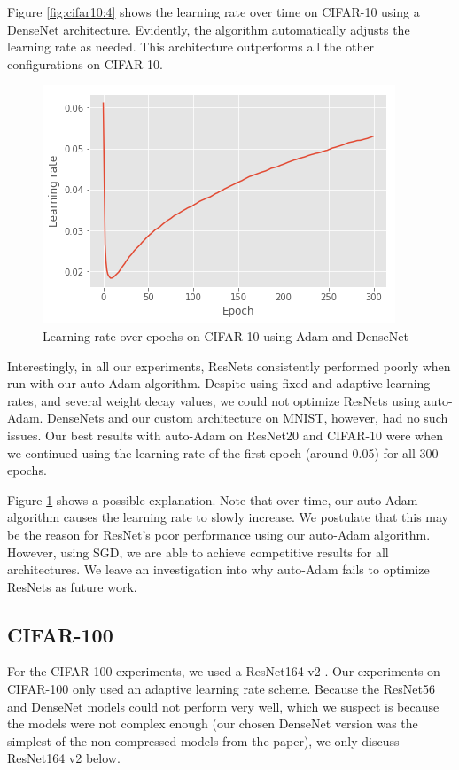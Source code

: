 \documentclass{article}
\begin{document}
Figure \ref{fig:cifar10:4} shows the learning rate over time on CIFAR-10 using a DenseNet architecture. Evidently, the algorithm automatically adjusts the learning rate as needed. This architecture outperforms all the other configurations on CIFAR-10.

\begin{figure}
    \centering
    \includegraphics[scale=0.4]{cifar10-dn-adam.png}
    \caption{Learning rate over epochs on CIFAR-10 using Adam and DenseNet}
    \label{fig:cifar10:5}
\end{figure}

Interestingly, in all our experiments, ResNets consistently performed poorly when run with our auto-Adam algorithm. Despite using fixed and adaptive learning rates, and several weight decay values, we could not optimize ResNets using auto-Adam. DenseNets and our custom architecture on MNIST, however, had no such issues. Our best results with auto-Adam on ResNet20 and CIFAR-10 were when we continued using the learning rate of the first epoch (around 0.05) for all 300 epochs. 

Figure \ref{fig:cifar10:5} shows a possible explanation. Note that over time, our auto-Adam algorithm causes the learning rate to slowly increase. We postulate that this may be the reason for ResNet's poor performance using our auto-Adam algorithm. However, using SGD, we are able to achieve competitive results for all architectures. We leave an investigation into why auto-Adam fails to optimize ResNets as future work.

\subsection{CIFAR-100}
For the CIFAR-100 experiments, we used a ResNet164 v2 \cite{he2016identity}. Our experiments on CIFAR-100 only used an adaptive learning rate scheme. Because the ResNet56 and DenseNet models could not perform very well, which we suspect is because the models were not complex enough (our chosen DenseNet version was the simplest of the non-compressed models from the paper\cite{huang2017densely}), we only discuss ResNet164 v2 below. 
\end{document}
